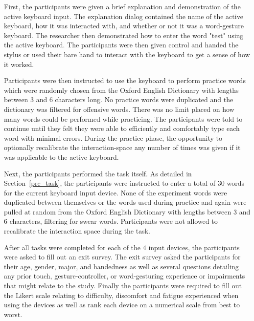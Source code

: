 First, the participants were given a brief explanation and demonstration of the active keyboard input. The explanation dialog contained the name of the active keyboard, how it was interacted with, and whether or not it was a word-gesture keyboard. The researcher then demonstrated how to enter the word "test" using the active keyboard. The participants were then given control and handed the stylus or used their bare hand to interact with the keyboard to get a sense of how it worked.

Participants were then instructed to use the keyboard to perform practice words which were randomly chosen from the Oxford English Dictionary with lengths between 3 and 6 characters long. No practice words were duplicated and the dictionary was filtered for offensive words. There was no limit placed on how many words could be performed while practicing. The participants were told to continue until they felt they were able to efficiently and comfortably type each word with minimal errors. During the practice phase, the opportunity to optionally recalibrate the interaction-space any number of times was given if it was applicable to the active keyboard.

Next, the participants performed the task itself. As detailed in Section~\ref{pre_task}, the participants were instructed to enter a total of 30 words for the current keyboard input device. None of the experiment words were duplicated between themselves or the words used during practice and again were pulled at random from the Oxford English Dictionary with lengths between 3 and 6 characters, filtering for swear words. Participants were not allowed to recalibrate the interaction space during the task. 

After all tasks were completed for each of the 4 input devices, the participants were asked to fill out an exit survey. The exit survey asked the participants for their age, gender, major, and handedness as well as several questions detailing any prior touch, gesture-controller, or word-gesturing experience or impairments that might relate to the study. Finally the participants were required to fill out the Likert scale relating to difficulty, discomfort and fatigue experienced when using the devices as well as rank each device on a numerical scale from best to worst.

